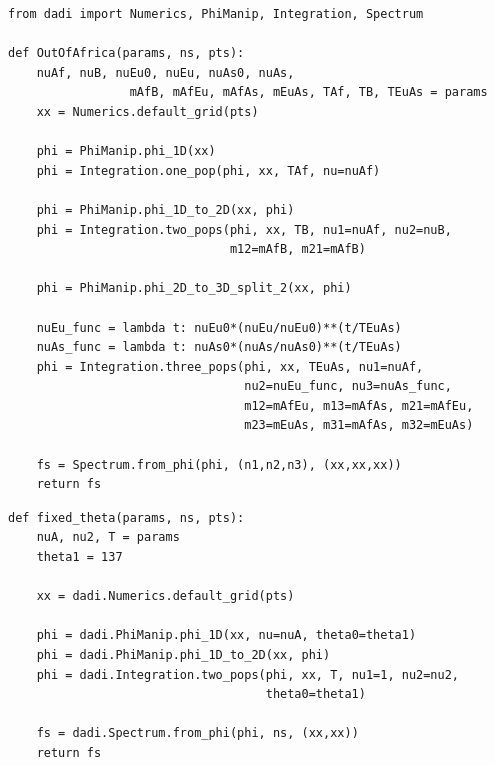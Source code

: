 \documentclass[12pt]{article}
\makeatletter
\newcommand{\py}[1]{\lstinline[language=Python, showstringspaces=False]@#1@}
\makeatother
\begin{document}
\begin{lstlisting}[caption={\textbf{Out-of-Africa model from Gutenkunst (2009):} This model involves a size change in the ancestral population, a split, another split, and then exponential growth of populations 1 and 2. (The \py{from dadi import} line imports those modules from the \py{dadi} namespace into the local namespace, so we don't have to type \py{dadi.} to access them.)}, float]
from dadi import Numerics, PhiManip, Integration, Spectrum

def OutOfAfrica(params, ns, pts):
    nuAf, nuB, nuEu0, nuEu, nuAs0, nuAs, 
                 mAfB, mAfEu, mAfAs, mEuAs, TAf, TB, TEuAs = params
    xx = Numerics.default_grid(pts)

    phi = PhiManip.phi_1D(xx)
    phi = Integration.one_pop(phi, xx, TAf, nu=nuAf)

    phi = PhiManip.phi_1D_to_2D(xx, phi)
    phi = Integration.two_pops(phi, xx, TB, nu1=nuAf, nu2=nuB, 
                               m12=mAfB, m21=mAfB)

    phi = PhiManip.phi_2D_to_3D_split_2(xx, phi)

    nuEu_func = lambda t: nuEu0*(nuEu/nuEu0)**(t/TEuAs)
    nuAs_func = lambda t: nuAs0*(nuAs/nuAs0)**(t/TEuAs)
    phi = Integration.three_pops(phi, xx, TEuAs, nu1=nuAf, 
                                 nu2=nuEu_func, nu3=nuAs_func, 
                                 m12=mAfEu, m13=mAfAs, m21=mAfEu,
                                 m23=mEuAs, m31=mAfAs, m32=mEuAs)

    fs = Spectrum.from_phi(phi, (n1,n2,n3), (xx,xx,xx))
    return fs
\end{lstlisting}

\begin{lstlisting}[caption={\textbf{Fixed $\boldsymbol{\theta}$:} A split demographic model function with a fixed value of $\theta$=137 for derived population 1. The free parameters are the sizes of the ancestral pop, \py{nuA}, and derived pop 2, \py{nu2}, (relative to derived pop 1), along with the divergence time \py{T} between the two derived pops.}, label={lst:fixed_theta}, float]
def fixed_theta(params, ns, pts):
    nuA, nu2, T = params
    theta1 = 137
    
    xx = dadi.Numerics.default_grid(pts)
    
    phi = dadi.PhiManip.phi_1D(xx, nu=nuA, theta0=theta1)
    phi = dadi.PhiManip.phi_1D_to_2D(xx, phi)
    phi = dadi.Integration.two_pops(phi, xx, T, nu1=1, nu2=nu2,
                                    theta0=theta1)
                                    
    fs = dadi.Spectrum.from_phi(phi, ns, (xx,xx))
    return fs
\end{lstlisting}
\end{document}
